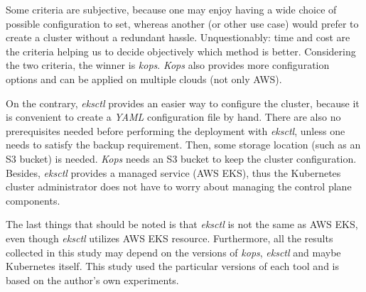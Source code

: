 Some criteria are subjective, because one may enjoy having a wide choice of possible configuration to set, whereas another (or other use case) would prefer to create a cluster without a redundant hassle. Unquestionably: time and cost are the criteria helping us to decide objectively which method is better. Considering the two criteria, the winner is \textit{kops}. \textit{Kops} also provides more configuration options and can be applied on multiple clouds (not only AWS).

On the contrary, \textit{eksctl} provides an easier way to configure the cluster, because it is convenient to create a \textit{YAML} configuration file by hand. There are also no prerequisites needed before performing the deployment with \textit{eksctl}, unless one needs to satisfy the backup requirement. Then, some storage location (such as an S3 bucket) is needed. \textit{Kops} needs an S3 bucket to keep the cluster configuration. Besides, \textit{eksctl} provides a managed service (AWS EKS), thus the Kubernetes cluster administrator does not have to worry about managing the control plane components.

The last things that should be noted is that \textit{eksctl} is not the same as AWS EKS, even though \textit{eksctl} utilizes AWS EKS resource. Furthermore, all the results collected in this study may depend on the versions of \textit{kops}, \textit{eksctl} and maybe Kubernetes itself. This study used the particular versions of each tool and is based on the author's own experiments.
